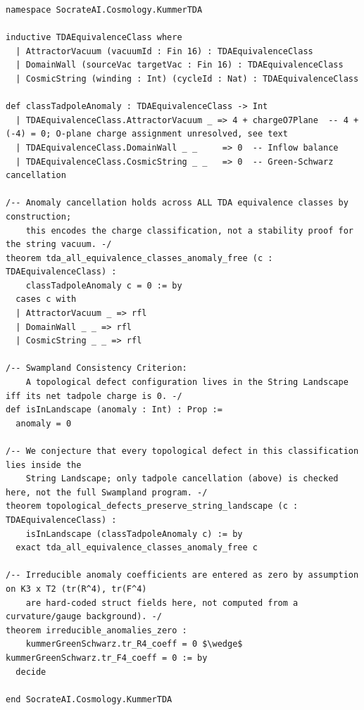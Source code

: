 \documentclass[11pt,a4paper]{article}
\begin{document}
\begin{lstlisting}[language=lean, caption={Lean 4 Consistency Check for TDA Equivalence-Class Charge Assignment}, label={lst:tda_anomaly}]
namespace SocrateAI.Cosmology.KummerTDA

inductive TDAEquivalenceClass where
  | AttractorVacuum (vacuumId : Fin 16) : TDAEquivalenceClass
  | DomainWall (sourceVac targetVac : Fin 16) : TDAEquivalenceClass
  | CosmicString (winding : Int) (cycleId : Nat) : TDAEquivalenceClass

def classTadpoleAnomaly : TDAEquivalenceClass -> Int
  | TDAEquivalenceClass.AttractorVacuum _ => 4 + chargeO7Plane  -- 4 + (-4) = 0; O-plane charge assignment unresolved, see text
  | TDAEquivalenceClass.DomainWall _ _     => 0  -- Inflow balance
  | TDAEquivalenceClass.CosmicString _ _   => 0  -- Green-Schwarz cancellation

/-- Anomaly cancellation holds across ALL TDA equivalence classes by construction;
    this encodes the charge classification, not a stability proof for the string vacuum. -/
theorem tda_all_equivalence_classes_anomaly_free (c : TDAEquivalenceClass) :
    classTadpoleAnomaly c = 0 := by
  cases c with
  | AttractorVacuum _ => rfl
  | DomainWall _ _ => rfl
  | CosmicString _ _ => rfl

/-- Swampland Consistency Criterion:
    A topological defect configuration lives in the String Landscape iff its net tadpole charge is 0. -/
def isInLandscape (anomaly : Int) : Prop :=
  anomaly = 0

/-- We conjecture that every topological defect in this classification lies inside the
    String Landscape; only tadpole cancellation (above) is checked here, not the full Swampland program. -/
theorem topological_defects_preserve_string_landscape (c : TDAEquivalenceClass) :
    isInLandscape (classTadpoleAnomaly c) := by
  exact tda_all_equivalence_classes_anomaly_free c

/-- Irreducible anomaly coefficients are entered as zero by assumption on K3 x T2 (tr(R^4), tr(F^4)
    are hard-coded struct fields here, not computed from a curvature/gauge background). -/
theorem irreducible_anomalies_zero :
    kummerGreenSchwarz.tr_R4_coeff = 0 $\wedge$ kummerGreenSchwarz.tr_F4_coeff = 0 := by
  decide

end SocrateAI.Cosmology.KummerTDA
\end{lstlisting}
\end{document}
